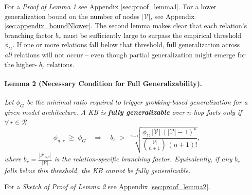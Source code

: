             For a \emph{Proof of Lemma 1} see Appendix \ref{sec:proof_lemma1}. For a lower generalization bound on the number of nodes $|\mathcal{V}|$, see Appendix \ref{sec:appendix_boundNlower}.           
            The second lemma makes clear that each relation’s branching factor $b_r$ must be sufficiently large to surpass the empirical threshold $\phi_G$. If one or more relations fall below that threshold, full generalization across \emph{all} relations will not occur -- even though partial generalization might emerge for the higher- $b_r$ relations.
            
        \paragraph{Lemma 2 (Necessary Condition for Full Generalizability).}
            \label{lem:phi_condition}
            \emph{Let $\phi_G$ be the minimal ratio required to trigger grokking-based generalization for a given model architecture. A KB is \textbf{fully generalizable} over $n$-hop facts only if $ \forall\,r\in\mathcal{R}$}
            \[ 
             \phi_{n,r} 
            \;\geq\; 
            \phi_G 
            \quad\Rightarrow\quad
            b_r 
            \;>\; 
            \sqrt[n-1]{\frac{\phi_G\,|\mathcal{V}|\,(|\mathcal{V}|-1)^{n}}{\binom{|\mathcal{V}|}{n+1}\,(n+1)!}},
            \]
            \emph{where $b_r=\frac{|\mathcal{F}_{A,r}|}{|\mathcal{V}|}$ is the relation-specific branching factor. Equivalently, if any $b_r$ falls below this threshold, the KB cannot be fully generalizable.}

            For a \emph{Sketch of Proof of Lemma 2} see Appendix \ref{sec:proof_lemma2}. 
            
